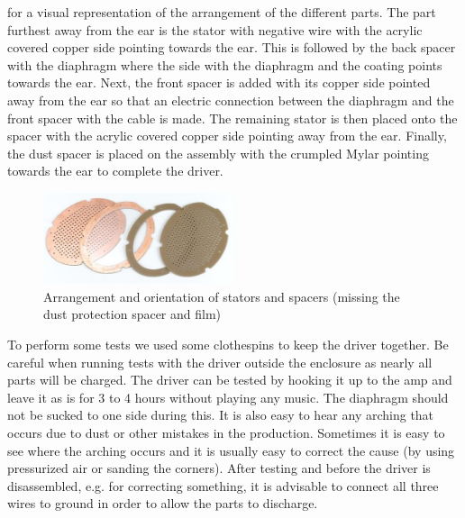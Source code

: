 \documentclass{article}
\begin{document}
for a visual representation of the arrangement of the different parts. The part furthest away from the ear is the stator with negative wire with the acrylic covered copper side pointing towards the ear. This is followed by the back spacer with the diaphragm where the side with the diaphragm and the coating points towards the ear. Next, the front spacer is added with its copper side pointed away from the ear so that an electric connection between the diaphragm and the front spacer with the cable is made. The remaining stator is then placed onto the spacer with the acrylic covered copper side pointing away from the ear. Finally, the dust spacer is placed on the assembly with the crumpled Mylar pointing towards the ear to complete the driver.

\begin{figure}[htb]
    \centering
    \includegraphics[width=0.5\textwidth]{images/arrangement.png}
    \caption{Arrangement and orientation of stators and spacers (missing the dust protection spacer and film)}
    \label{f:driver:assembly:arrangement}
\end{figure}

To perform some tests we used some clothespins to keep the driver together. Be careful when running tests with the driver outside the enclosure as nearly all parts will be charged. The driver can be tested by hooking it up to the amp and leave it as is for 3 to 4 hours without playing any music. The diaphragm should not be sucked to one side during this. It is also easy to hear any arching that occurs due to dust or other mistakes in the production. Sometimes it is easy to see where the arching occurs and it is usually easy to correct the cause (by using pressurized air or sanding the corners). After testing and before the driver is disassembled, e.g. for correcting something, it is advisable to connect all three wires to ground in order to allow the parts to discharge.
\end{document}
